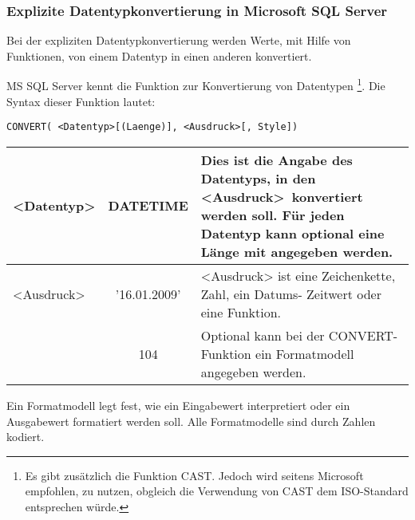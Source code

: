         \subsubsection{Explizite Datentypkonvertierung in Microsoft SQL Server}
          \begin{merke}
            Bei der expliziten Datentypkonvertierung werden Werte, mit Hilfe von Funktionen, von einem Datentyp in einen anderen konvertiert.
          \end{merke}
          MS SQL Server kennt die Funktion  zur Konvertierung von Datentypen \footnote{Es gibt zus\"atzlich die Funktion CAST. Jedoch wird seitens Microsoft empfohlen,  zu nutzen, obgleich die Verwendung von CAST dem ISO-Standard entsprechen w\"urde.}. Die Syntax dieser Funktion lautet:
          \begin{lstlisting}[language=ms_sql,caption={Die Syntax der CONVERT-Funktion in MS SQL Server},label=sql03_31]
CONVERT( <Datentyp>[(Laenge)], <Ausdruck>[, Style])
          \end{lstlisting}
          \begin{center}
            \label{argconvert}
            \begin{small}
              \tabletail{
                \hline
              }
              \tablelasttail{
                \hline
              }
              \begin{supertabular}{|l|c|p{8.5cm}|}
                \textless Datentyp\textgreater & DATETIME & Dies ist die Angabe des Datentyps, in den \textless Ausdruck\textgreater\ konvertiert werden soll.  F\"ur jeden Datentyp kann optional eine L\"ange mit angegeben werden.\\
                \hline
                \textless Ausdruck\textgreater & '16.01.2009'& <Ausdruck> ist eine Zeichenkette, Zahl, ein Datums- Zeitwert oder eine Funktion. \\
                \hline
                [Style] & 104 & Optional kann bei der CONVERT-Funktion ein Formatmodell angegeben werden. \\
              \end{supertabular}
            \end{small}
          \end{center}
          Ein Formatmodell legt fest, wie ein Eingabewert interpretiert oder ein Ausgabewert formatiert werden soll. Alle Formatmodelle sind durch Zahlen kodiert.

